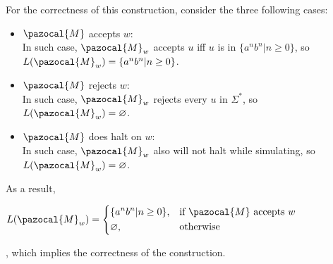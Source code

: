 \documentclass{article}
\begin{document}
    For the correctness of this construction, consider the three following cases:\\
    \begin{itemize}
        \item \(\pazocal{M}\) accepts \(w\):\\
            In such case, \(\pazocal{M}_w\) accepts \(u\) iff \(u\) is in \(\{a^nb^n | n \geq 0\}\), so \(L(\pazocal{M}_w) = \{a^nb^n | n \geq 0\}\).\\
        \item \(\pazocal{M}\) rejects \(w\):\\
            In such case, \(\pazocal{M}_w\) rejects every \(u\) in \(\Sigma^*\), so \(L(\pazocal{M}_w) = \varnothing\).\\
        \item \(\pazocal{M}\) does halt on \(w\):\\
            In such case, \(\pazocal{M}_w\) also will not halt while simulating, so \(L(\pazocal{M}_w) = \varnothing\).\\
    \end{itemize}

    As a result, \begin{center}\(L(\pazocal{M}_w)=\left\{\begin{aligned}
    &\{a^nb^n|n\geq 0\}, && \text{if } \pazocal{M} \text{ accepts } w \\
    &\varnothing, && \text{otherwise}
    \end{aligned} \right.\)\end{center}, which implies the correctness of the construction.
\end{document}
